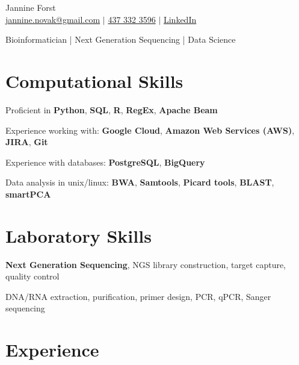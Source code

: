 \documentclass[11pt]{article}
\begin{document}
\begin{center}
    {\fontsize{36}{36}\selectfont\intermedium Jannine Forst} \\ \bigskip
    {\color{icnclr}\faEnvelope[regular]} \href{mailto:jannine.novak@gmail.com}{jannine.novak@gmail.com} $|$ 
    {\color{icnclr}} \href{tel:1234567890}{437 332 3596} $|$
    \href{https://www.linkedin.com/in/jannine-forst/}{\color{icnclr}\faLinkedin} 
    \href{https://www.linkedin.com/in/jannine-forst/} {LinkedIn}
    

    \item{Bioinformatician | Next Generation Sequencing | Data Science}
\end{center}

\section{Computational Skills}
\begin{description}
    \item Proficient in \textbf{Python}, \textbf{SQL}, \textbf{R}, \textbf{RegEx}, \textbf{Apache Beam}
    \item Experience working with: \textbf{Google Cloud}, \textbf{Amazon Web Services (AWS)}, \textbf{JIRA}, \textbf{Git}
    \item Experience with databases: \textbf{PostgreSQL}, \textbf{BigQuery}
    \item Data analysis in unix/linux: \textbf{BWA}, \textbf{Samtools}, \textbf{Picard tools}, \textbf{BLAST}, \textbf{smartPCA}
\end{description}

\section{Laboratory Skills}
\begin{description}
    \item \textbf{Next Generation Sequencing}, NGS library construction, target capture, quality control
    \item DNA/RNA extraction, purification, primer design, PCR, qPCR, Sanger sequencing
\end{description}


\section{Experience}
\bigskip
\end{document}

